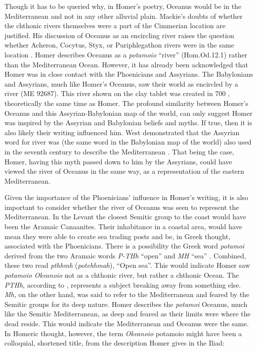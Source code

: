 	Though it has to be queried why, in Homer’s poetry, Oceanus would be in the Mediterranean and not in any other alluvial plain. Mackie’s doubts of whether the chthonic rivers themselves were a part of the Cimmerian location are justified. His discussion of Oceanus as an encircling river raises the question whether Acheron, Cocytus, Styx, or Puriphlegathon rivers were in the same location \parencite[486]{Mackie1999}. Homer describes Oceanus as a \emph{potamoio} “river” (Hom.Od.12.1) rather than the Mediterranean Ocean. However, it has already been acknowledged that Homer was in close contact with the Phoenicians and Assyrians. The Babylonians and Assyrians, much like Homer’s Oceanus, saw their world as encircled by a river (ME 92687). This river shown on the clay tablet was created in 700 \BC, theoretically the same time as Homer. The profound similarity between Homer’s Oceanus and this Assyrian-Babylonian map of the world, can only suggest Homer was inspired by the Assyrian and Babylonian beliefs and myths. If true, then it is also likely their writing influenced him. West demonstrated that the Assyrian word for river was (the same word in the Babylonian map of the world) also used in the seventh century \BC to describe the Mediterranean \parencite[145]{West1997}. That being the case, Homer, having this myth passed down to him by the Assyrians, could have viewed the river of Oceanus in the same way, as a representation of the eastern Mediterranean.
		
	Given the importance of the Phoenicians’ influence in Homer’s writing, it is also important to consider whether the river of Oceanus was seen to represent the Mediterranean. In the Levant the closest Semitic group to the coast would have been the Aramaic Canaanites. Their inhabitance in a coastal area, would have mean they were able to create sea trading posts and be, in Greek thought, associated with the Phoenicians. There is a possibility the Greek word \emph{potamoi} derived from the two Aramaic words \emph{P-THh} “open” \parencite[422]{Benner2005} and \emph{MH} “sea” \parencite[166]{Benner2005}. Combined, these two read \emph{pthhmh} (\emph{potehhmah}), “Open sea”. This would indicate Homer saw \emph{potamoio Okeanoio} not as a chthonic river, but rather a chthonic Ocean. The \emph{PTHh}, according to \textcite{Benner2005}, represents a subject breaking away from something else. \emph{Mh}, on the other hand, was said to refer to the Mediterranean and feared by the Semitic groups for its deep nature. Homer describes the \emph{potamoi} Oceanus, much like the Semitic Mediterranean, as deep and feared as their limits were where the dead reside. This would indicate the Mediterranean and Oceanus were the same.  In Homeric thought, however, the term \emph{Okeanoio} potamoio might have been a colloquial, shortened title, from the description Homer gives in the Iliad:
	
